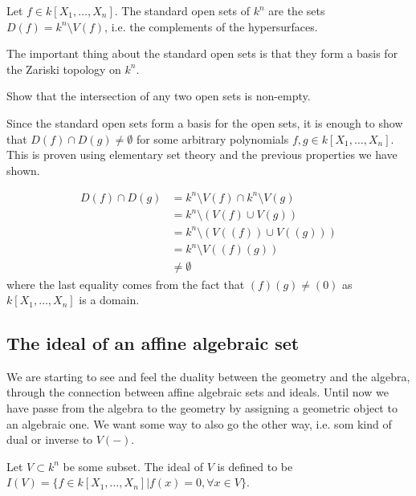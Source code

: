 \begin{definition}
Let $f\in k[X_1, \ldots, X_n]$. The standard open sets of $k^n$ are the sets $D(f)=k^n \setminus V(f)$, i.e. the complements of the hypersurfaces. 
\end{definition}

The important thing about the standard open sets is that they form a basis for the Zariski topology on $k^n$. 

\begin{problem}
Show that the intersection of any two open sets is non-empty. 
\end{problem}
\begin{solution}
Since the standard open sets form a basis for the open sets, it is enough to show that $D(f)\cap D(g) \neq \emptyset$ for some arbitrary polynomials $f, g\in k[X_1, \ldots, X_n]$. This is proven using elementary set theory and the previous properties we have shown. 

\begin{align*}
    D(f)\cap D(g) 
    &= k^n\setminus V(f) \cap k^n\setminus V(g) \\
    &= k^n\setminus (V(f)\cup V(g)) \\
    &= k^n\setminus (V((f))\cup V((g))) \\
    &= k^n\setminus V((f)(g)) \\
    &\neq \emptyset
\end{align*}
where the last equality comes from the fact that $(f)(g)\neq (0)$ as $k[X_1, \ldots, X_n]$ is a domain.  
\end{solution}

\subsection{The ideal of an affine algebraic set}

We are starting to see and feel the duality between the geometry and the algebra, through the connection between affine algebraic sets and ideals. Until now we have passe from the algebra to the geometry by assigning a geometric object to an algebraic one. We want some way to also go the other way, i.e. som kind of dual or inverse to $V(-)$.

\begin{definition}
Let $V\subset k^n$ be some subset. The ideal of $V$ is defined to be $I(V)=\{ f\in k[X_1, \ldots, X_n] \vert f(x)=0, \forall x\in V \}$. 
\end{definition}

